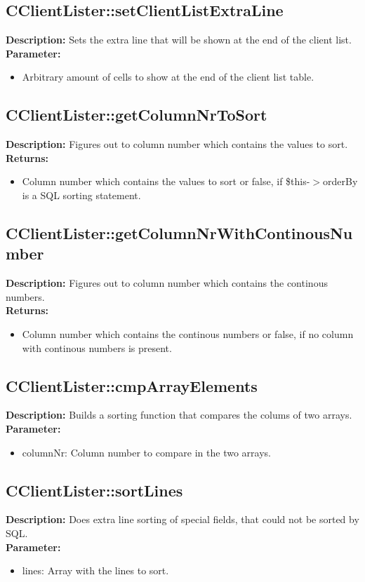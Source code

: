 \subsection{CClientLister::setClientListExtraLine}
\textbf{Description:} Sets the extra line that will be shown at the end of the client list.\\
\textbf{Parameter:}
\begin{itemize}
\item Arbitrary amount of cells to show at the end of the client list table.
\end{itemize}

\subsection{CClientLister::getColumnNrToSort}
\textbf{Description:} Figures out to column number which contains the values to sort.\\
\textbf{Returns:}
\begin{itemize}
\item Column number which contains the values to sort or false, if \$this-$>$orderBy is a SQL sorting statement.
\end{itemize}

\subsection{CClientLister::getColumnNrWithContinousNumber}
\textbf{Description:} Figures out to column number which contains the continous numbers.\\
\textbf{Returns:}
\begin{itemize}
\item Column number which contains the continous numbers or false, if no column with continous numbers is present.
\end{itemize}

\subsection{CClientLister::cmpArrayElements}
\textbf{Description:} Builds a sorting function that compares the colums of two arrays.\\
\textbf{Parameter:}
\begin{itemize}
\item columnNr: Column number to compare in the two arrays.
\end{itemize}

\subsection{CClientLister::sortLines}
\textbf{Description:} Does extra line sorting of special fields, that could not be sorted by SQL.\\
\textbf{Parameter:}
\begin{itemize}
\item lines: Array with the lines to sort.
\end{itemize}

